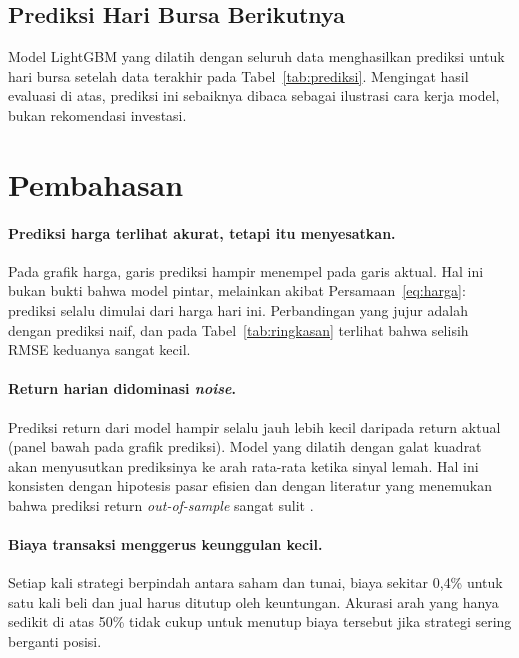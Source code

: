\documentclass[11pt,a4paper]{article}
\begin{document}
\subsection{Prediksi Hari Bursa Berikutnya}
Model LightGBM yang dilatih dengan seluruh data menghasilkan prediksi untuk hari bursa
setelah data terakhir pada Tabel~\ref{tab:prediksi}. Mengingat hasil evaluasi di atas,
prediksi ini sebaiknya dibaca sebagai ilustrasi cara kerja model, bukan rekomendasi
investasi.

\begin{table}[H]
  \centering
  \caption{Prediksi LightGBM untuk hari bursa berikutnya. Sinyal \textsc{beli} jika
  prediksi return positif, \textsc{tunai} jika tidak.}
  \label{tab:prediksi}
  \small
  
\end{table}

\section{Pembahasan}

\paragraph{Prediksi harga terlihat akurat, tetapi itu menyesatkan.}
Pada grafik harga, garis prediksi hampir menempel pada garis aktual. Hal ini bukan bukti
bahwa model pintar, melainkan akibat Persamaan~\eqref{eq:harga}: prediksi selalu dimulai dari
harga hari ini. Perbandingan yang jujur adalah dengan prediksi naif, dan pada
Tabel~\ref{tab:ringkasan} terlihat bahwa selisih RMSE keduanya sangat kecil.

\paragraph{Return harian didominasi \emph{noise}.}
Prediksi return dari model hampir selalu jauh lebih kecil daripada return aktual (panel bawah
pada grafik prediksi). Model yang dilatih dengan galat kuadrat akan menyusutkan prediksinya
ke arah rata-rata ketika sinyal lemah. Hal ini konsisten dengan hipotesis pasar efisien dan
dengan literatur yang menemukan bahwa prediksi return \emph{out-of-sample} sangat sulit
\citep{welch2008}.

\paragraph{Biaya transaksi menggerus keunggulan kecil.}
Setiap kali strategi berpindah antara saham dan tunai, biaya sekitar 0{,}4\% untuk satu kali
beli dan jual harus ditutup oleh keuntungan. Akurasi arah yang hanya sedikit di atas 50\%
tidak cukup untuk menutup biaya tersebut jika strategi sering berganti posisi.
\end{document}
